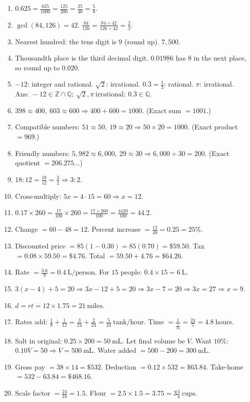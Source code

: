 \documentclass[11pt]{article}
\begin{document}
\begin{enumerate}
  \item \(0.625 = \frac{625}{1000} = \frac{125}{200} = \frac{25}{40} = \boxed{\frac{5}{8}}\).
  \item \(\gcd(84,126)=42\). \(\frac{84}{126}=\frac{84\div 42}{126\div 42}=\boxed{\frac{2}{3}}\).
  \item Nearest hundred: the tens digit is \(9\) (round up). \(\boxed{7{,}500}\).
  \item Thousandth place is the third decimal digit. \(0.019\underline{8}6\) has \(8\) in the next place, so round up to \(\boxed{0.020}\).
  \item \(-12\): integer and rational. \(\sqrt{2}\): irrational. \(0.\overline{3}=\frac{1}{3}\): rational. \(\pi\): irrational. \\
  \(\boxed{\text{Ans: } -12\in \mathbb{Z}\cap\mathbb{Q};\ \sqrt{2},\pi\ \text{irrational};\ 0.\overline{3}\in \mathbb{Q}.}\)
  \item \(398\approx 400,\ 603\approx 600\Rightarrow 400+600=\boxed{1000}\). (Exact sum \(=1001\).)
  \item Compatible numbers: \(51\approx 50,\ 19\approx 20\Rightarrow 50\times 20=\boxed{1000}\). (Exact product \(=969\).)
  \item Friendly numbers: \(5{,}982\approx 6{,}000,\ 29\approx 30\Rightarrow 6{,}000\div 30=\boxed{200}\). (Exact quotient \(=206.275\ldots\))
  \item \(18:12=\frac{18}{12}=\frac{3}{2}\Rightarrow \boxed{3:2}\).
  \item Cross-multiply: \(5x=4\cdot 15=60\Rightarrow x=\boxed{12}\).
  \item \(0.17\times 260=\frac{17}{100}\times 260=\frac{17\times 260}{100}= \frac{4420}{100}=\boxed{44.2}\).
  \item Change \(=60-48=12\). Percent increase \(=\frac{12}{48}=0.25=\boxed{25\%}\).
  \item Discounted price \(=85(1-0.30)=85(0.70)=\$59.50\). Tax \(=0.08\times 59.50=\$4.76\). Total \(=59.50+4.76=\boxed{\$64.26}\).
  \item Rate \(=\frac{3.6}{9}=0.4\ \text{L/person}\). For \(15\) people: \(0.4\times 15=\boxed{6\ \text{L}}\).
  \item \(3(x-4)+5=20\Rightarrow 3x-12+5=20\Rightarrow 3x-7=20\Rightarrow 3x=27\Rightarrow x=\boxed{9}\).
  \item \(d=rt=12\times 1.75=\boxed{21\ \text{miles}}\).
  \item Rates add: \(\frac{1}{8}+\frac{1}{12}=\frac{3}{24}+\frac{2}{24}=\frac{5}{24}\ \text{tank/hour}\). Time \(=\frac{1}{\frac{5}{24}}=\boxed{\frac{24}{5}=4.8\ \text{hours}}\).
  \item Salt in original: \(0.25\times 200=50\ \text{mL}\). Let final volume be \(V\). Want \(10\%\): \(0.10V=50\Rightarrow V=500\ \text{mL}\). Water added \(=500-200=\boxed{300\ \text{mL}}\).
  \item Gross pay \(=38\times 14=\$532\). Deduction \(=0.12\times 532=\$63.84\). Take-home \(=532-63.84=\boxed{\$468.16}\).
  \item Scale factor \(=\frac{24}{16}=1.5\). Flour \(=2.5\times 1.5=3.75=\boxed{3\frac{3}{4}\ \text{cups}}\).
\end{enumerate}
\end{document}
